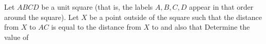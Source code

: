 Let $ ABCD$ be a unit square (that is, the labels $ A, B, C, D$ appear in that order around the square). Let $ X$ be a point outside of the square such that the distance from $ X$ to $ AC$ is equal to the distance from $ X$ to  and also that   Determine the value of 